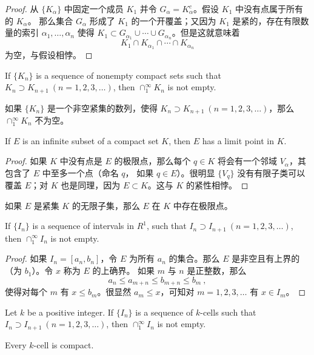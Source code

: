 \documentclass[../poma-notes.tex]{subfiles}
\begin{document}
\begin{proof}
  从 $\{K_{\alpha}\}$ 中固定一个成员 $K_1$ 并令 $G_{\alpha} = K_{\alpha}^c$。假设 $K_1$ 中没有点属于所有的 $K_{\alpha}$。
  那么集合 $G_{\alpha}$ 形成了 $K_1$ 的一个开覆盖；又因为 $K_1$ 是紧的，存在有限数量的索引 $\alpha_1,\dots,\alpha_n$ 使得
  $K_1 \subset G_{\alpha_1} \cup \cdots \cup G_{\alpha_n}$。但是这就意味着
  \[K_1 \cap K_{\alpha_1} \cap \cdots \cap K_{\alpha_n}\]
  为空，与假设相悖。
\end{proof}

\begin{corollary}
  If $\{K_n\}$ is a sequence of nonempty compact sets such that $K_n \supset K_{n+1} \ (n=1,2,3,\dots)$, then
  $\cap_1^{\infty} K_n$ is not empty.
\end{corollary}

\anote
如果 $\{K_n\}$ 是一个非空紧集的数列，使得 $K_n \supset K_{n+1} \ (n=1,2,3,\dots)$，那么 $\cap_1^{\infty} K_n$ 不为空。

\begin{theorem}
  If $E$ is an infinite subset of a compact set $K$, then $E$ has a limit point in $K$.
\end{theorem}

\begin{proof}
  如果 $K$ 中没有点是 $E$ 的极限点，那么每个 $q \in K$ 将会有一个邻域 $V_{\alpha}$，其包含了 $E$ 中至多一个点（命名 $q$，
  如果 $q \in E$）。很明显 $\{V_q\}$ 没有有限子类可以覆盖 $E$；对 $K$ 也是同理，因为 $E \subset K$。这与 $K$ 的紧性相悖。
\end{proof}

\anote
如果 $E$ 是紧集 $K$ 的无限子集，那么 $E$ 在 $K$ 中存在极限点。

\begin{theorem}
  If $\{I_n\}$ is a sequence of intervals in $R^1$, such that $I_n \supset I_{n+1} \ (n=1,2,3,\dots)$, then
  $\cap_1^{\infty} I_n$ is not empty.
\end{theorem}

\begin{proof}
  如果 $I_n = [a_n,b_n]$，令 $E$ 为所有 $a_n$ 的集合。那么 $E$ 是非空且有上界的（为 $b_1$）。令 $x$ 称为 $E$ 的上确界。
  如果 $m$ 与 $n$ 是正整数，那么
  \[a_n \le a_{m+n} \le b_{m+n} \le b_m \ ,\]
  使得对每个 $m$ 有 $x \le b_m$。很显然 $a_m \le x$，可知对 $m=1,2,3,\dots$ 有 $x \in I_m$。
\end{proof}

\begin{theorem}
  Let $k$ be a positive integer. If $\{I_n\}$ is a sequence of $k$-cells such that $I_n \supset I_{n+1} \ (n=1,2,3,\dots)$,
  then $\cap_1^{\infty} I_n$ is not empty.
\end{theorem}


\begin{theorem}
  Every $k$-cell is compact.
\end{theorem}

\end{document}
